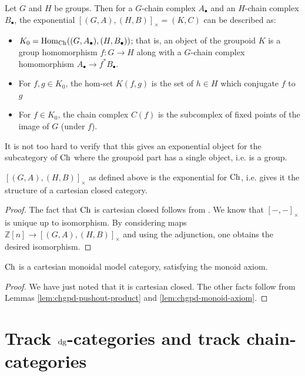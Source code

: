 \documentclass[12pt]{amsart}
\begin{document}
\begin{example}
	Let $G$ and $H$ be groups. Then for a $G$-chain complex $A_\bullet$ and an $H$-chain complex $B_\bullet$, the exponential $[(G,A),(H,B)]_\times = (K,C)$ can be described as:
	\begin{itemize}
		\item $K_0 = \mathrm{Hom}_{{\mathrm{Ch}}}((G,A_\bullet),(H,B_\bullet))$; that is, an object of the groupoid $K$ is a group homomorphism $f: G \to H$ along with a $G$-chain complex homomorphism $A_\bullet \to f^*B_\bullet$.
		\item For $f,g \in K_0$, the hom-set $K(f,g)$ is the set of $h \in H$ which conjugate $f$ to $g$
		\item For $f \in K_0$, the chain complex $C(f)$ is the subcomplex of fixed points of the image of $G$ (under $f$). 
	\end{itemize}
	It is not too hard to verify that this gives an exponential object for the subcategory of ${\mathrm{Ch}}$ where the groupoid part has a single object, i.e. is a group.
\end{example}
\begin{theorem}
		$[(G,A), (H,B)]_\times$ as defined above is the exponential for ${\mathrm{Ch}}$, i.e. gives it the structure of a cartesian closed category. 
\end{theorem}
\begin{proof}
	The fact that ${\mathrm{Ch}}$ is cartesian closed follows from \cite[Theorem 9.19, Example 9.11]{Nunes2024}. 
	We know that $[-,-]_\times$ is unique up to isomorphism. By considering maps $\mathbb{Z}[n] \to[(G,A), (H,B)]_\times$ and using the adjunction, one obtains the desired isomorphism.
\end{proof}

\begin{theorem}\label{thm:chgpd-monoidal-model-for-cartesian}
	${\mathrm{Ch}}$ is a cartesian monoidal model category, satisfying the monoid axiom.
\end{theorem}
\begin{proof}
	We have just noted that it is cartesian closed. The other facts follow from Lemmas \ref{lem:chgpd-pushout-product}
	and \ref{lem:chgpd-monoid-axiom}.
\end{proof}


\section{Track $\mathrm{dg}$-categories and track chain-categories}
\label{section:chgpd-categories}
\end{document}
